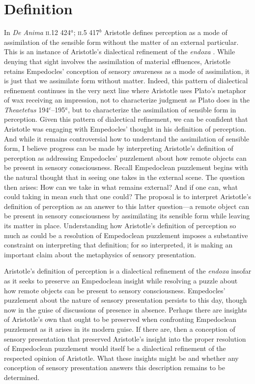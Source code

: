 
\section{Definition} %
\label{sec:definition}

In \emph{De Anima} \textsc{ii}.12 424\( ^{a} \); \textsc{ii}.5 417\( ^{b} \) Aristotle defines perception as a mode of assimilation of the sensible form without the matter of an external particular. This is an instance of Aristotle's dialectical refinement of the \emph{endoxa} \citep[on Aristotle's dialectic in \emph{De Anima} see][]{Witt:1995kx}. While denying that sight involves the assimilation of material effluences, Aristotle retains Empedocles' conception of sensory awareness as a mode of assimilation, it is just that we assimilate form without matter. Indeed, this pattern of dialectical refinement continues in the very next line where Aristotle uses Plato's metaphor of wax receiving an impression, not to characterize judgment as Plato does in the \emph{Theaetetus} 194\( ^{c} \)--195\( ^{a} \), but to characterize the assimilation of sensible form in perception. Given this pattern of dialectical refinement, we can be confident that Aristotle was engaging with Empedocles' thought in his definition of perception. And while it remains controversial how to understand the assimilation of sensible form, I believe progress can be made by interpreting Aristotle's definition of perception as addressing Empedocles' puzzlement about how remote objects can be present in sensory consciousness. Recall Empedoclean puzzlement begins with the natural thought that in seeing one takes in the external scene. The question then arises: How can we take in what remains external? And if one can, what could taking in mean such that one could? The proposal is to interpret Aristotle's definition of perception as an answer to this latter question---a remote object can be present in sensory consciousness by assimilating its sensible form while leaving its matter in place. Understanding how Aristotle's definition of perception so much as could be a resolution of Empedoclean puzzlement imposes a substantive constraint on interpreting that definition; for so interpreted, it is making an important claim about the metaphysics of sensory presentation.

Aristotle's definition of perception is a dialectical refinement of the \emph{endoxa} insofar as it seeks to preserve an Empedoclean insight while resolving a puzzle about how remote objects can be present to sensory consciousness. Empedocles' puzzlement about the nature of sensory presentation persists to this day, though now in the guise of discussions of presence in absence. Perhaps there are insights of Aristotle's own that ought to be preserved when confronting Empedoclean puzzlement as it arises in its modern guise. If there are, then a conception of sensory presentation that preserved Aristotle's insight into the proper resolution of Empedoclean puzzlement would itself be a dialectical refinement of the respected opinion of Aristotle. What these insights might be and whether any conception of sensory presentation answers this description remains to be determined.


